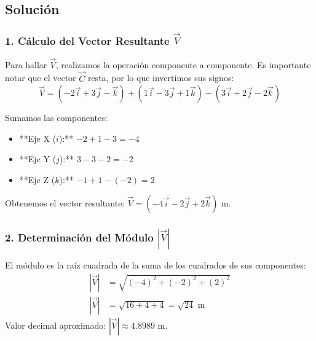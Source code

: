 \documentclass[12pt, a4paper]{article}
\begin{document}
\begin{center}
\end{center}

\subsection*{Solución}

\subsubsection*{1. Cálculo del Vector Resultante $\vec{V}$}
Para hallar $\vec{V}$, realizamos la operación componente a componente. Es importante notar que el vector $\vec{C}$ resta, por lo que invertimos sus signos:
\begin{equation*}
    \vec{V} = (-2\vec{i} + 3\vec{j} - \vec{k}) + (1\vec{i} - 3\vec{j} + 1\vec{k}) - (3\vec{i} + 2\vec{j} - 2\vec{k})
\end{equation*}

Sumamos las componentes:
\begin{itemize}
    \item **Eje X ($i$):** $-2 + 1 - 3 = -4$
    \item **Eje Y ($j$):** $3 - 3 - 2 = -2$
    \item **Eje Z ($k$):** $-1 + 1 - (-2) = 2$
\end{itemize}
Obtenemos el vector resultante: $\vec{V} = (-4\vec{i} - 2\vec{j} + 2\vec{k}) \text{ m}$.

\subsubsection*{2. Determinación del Módulo $|\vec{V}|$}
El módulo es la raíz cuadrada de la suma de los cuadrados de sus componentes:
\begin{align*}
    |\vec{V}| &= \sqrt{(-4)^2 + (-2)^2 + (2)^2} \\
    |\vec{V}| &= \sqrt{16 + 4 + 4} = \sqrt{24} \text{ m}
\end{align*}
Valor decimal aproximado: $|\vec{V}| \approx 4.8989 \text{ m}$.
\end{document}
